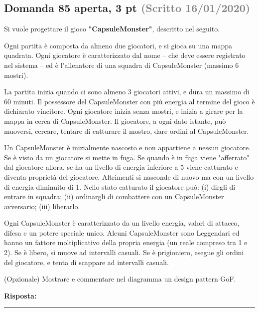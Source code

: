 \documentclass[a4paper,11pt]{article}
\begin{document}
\subsection*{Domanda 85 \hfill {\small aperta, 3 pt \textcolor{gray}{(Scritto 16/01/2020)}}}
\begin{tcolorbox}[colback=gray!8,colframe=gray!50,title=Contesto]
Si vuole progettare il gioco \textbf{"CapsuleMonster"}, descritto nel seguito.

Ogni partita è composta da almeno due giocatori, e si gioca su una mappa quadrata. Ogni giocatore è caratterizzato dal nome – che deve essere registrato nel sistema – ed è l'allenatore di una squadra di CapsuleMonster (massimo 6 mostri).

La partita inizia quando ci sono almeno 3 giocatori attivi, e dura un massimo di 60 minuti. Il possessore del CapsuleMonster con più energia al termine del gioco è dichiarato vincitore. Ogni giocatore inizia senza mostri, e inizia a girare per la mappa in cerca di CapsuleMonster. Il giocatore, a ogni dato istante, può muoversi, cercare, tentare di catturare il mostro, dare ordini al CapsuleMonster.

Un CapsuleMonster è inizialmente nascosto e non appartiene a nessun giocatore. Se è visto da un giocatore si mette in fuga. Se quando è in fuga viene "afferrato" dal giocatore allora, se ha un livello di energia inferiore a 5 viene catturato e diventa proprietà del giocatore. Altrimenti si nasconde di nuovo ma con un livello di energia diminuito di 1. Nello stato catturato il giocatore può: (i) dirgli di entrare in squadra; (ii) ordinargli di combattere con un CapsuleMonster avversario; (iii) liberarlo.

Ogni CapsuleMonster è caratterizzato da un livello energia, valori di attacco, difesa e un potere speciale unico. Alcuni CapsuleMonster sono Leggendari ed hanno un fattore moltiplicativo della propria energia (un reale compreso tra 1 e 2). Se è libero, si muove ad intervalli casuali. Se è prigioniero, esegue gli ordini del giocatore, e tenta di scappare ad intervalli casuali.
\end{tcolorbox}
(Opzionale) Mostrare e commentare nel diagramma un design pattern GoF.

\vspace{0.2cm}
\noindent\textbf{Risposta:}\par
\vspace{4cm}\hrule


\end{document}
